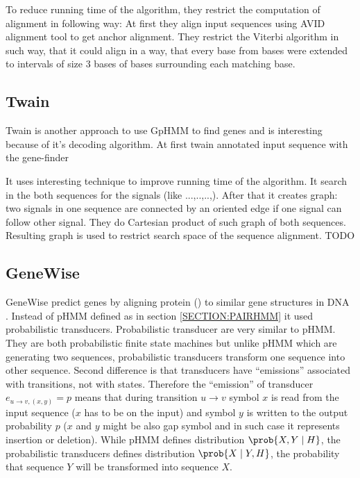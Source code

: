 To reduce running time of the algorithm, they restrict the computation of
alignment in following way: At first they  align input sequences using AVID
alignment tool\cite{Bray2003} to get anchor alignment. They restrict the Viterbi
algorithm in such way, that it could align  in a way, that every base from
bases were extended to intervals of size $3$ bases of bases surrounding each
matching base.



\subsection{Twain}

Twain is another approach to use GpHMM to find genes \cite{Majoros2005}
and is interesting because of it's decoding algorithm. At first 
twain annotated input sequence with the gene-finder

It uses interesting technique to improve
running time of the algorithm. It search in the both sequences for the signals
(like ...,..,..,). After that it creates graph: two signals in one sequence are
connected by an oriented edge if one signal can follow other signal. They do
Cartesian product of such graph of both sequences. Resulting graph is used to
restrict search space of the sequence alignment.
TODO


\subsection{GeneWise}

GeneWise predict genes by aligning protein () to similar gene structures in DNA
\cite{GeneWise2004}. Instead of pHMM defined as in section \ref{SECTION:PAIRHMM}
it used probabilistic transducers. Probabilistic transducer are very similar to
pHMM. They are both probabilistic finite state machines but unlike pHMM which
are generating two sequences, probabilistic transducers transform one sequence
into other sequence.  Second difference is that transducers have ``emissions''
associated with transitions, not with states.  Therefore the ``emission'' of
transducer $e_{u\to v,(x,y)}=p$ means that during transition $u\to v$ symbol $x$
is read from the input sequence ($x$ has to be on the input) and symbol $y$ is
written to the output probability $p$ ($x$ and $y$ might be also gap symbol and
in such case it represents insertion or deletion).  While pHMM defines
distribution $\prob{X,Y\mid H}$, the probabilistic transducers defines
distribution $\prob{X\mid Y,H}$, the probability that sequence $Y$ will be
transformed into sequence $X$.

